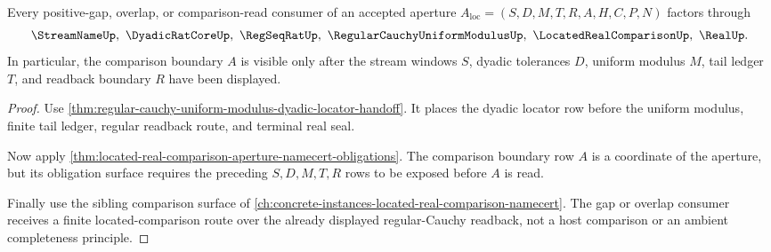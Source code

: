 \begin{theorem}
\label{thm:located-real-comparison-aperture-gap-route}
Every positive-gap, overlap, or comparison-read consumer of an accepted aperture $A_{\mathrm{loc}}=(S,D,M,T,R,A,H,C,P,N)$ factors through
$$
\StreamNameUp,\ \DyadicRatCoreUp,\ \RegSeqRatUp,\ \RegularCauchyUniformModulusUp,\ \LocatedRealComparisonUp,\ \RealUp .
$$
In particular, the comparison boundary $A$ is visible only after the stream windows $S$, dyadic tolerances $D$, uniform modulus $M$, tail ledger $T$, and readback boundary $R$ have been displayed.
\end{theorem}
\begin{proof}
Use \autoref{thm:regular-cauchy-uniform-modulus-dyadic-locator-handoff}. It places the dyadic locator row before the uniform modulus, finite tail ledger, regular readback route, and terminal real seal.

Now apply \autoref{thm:located-real-comparison-aperture-namecert-obligations}. The comparison boundary row $A$ is a coordinate of the aperture, but its obligation surface requires the preceding $S,D,M,T,R$ rows to be exposed before $A$ is read.

Finally use the sibling comparison surface of \autoref{ch:concrete-instances-located-real-comparison-namecert}. The gap or overlap consumer receives a finite located-comparison route over the already displayed regular-Cauchy readback, not a host comparison or an ambient completeness principle.
\end{proof}

